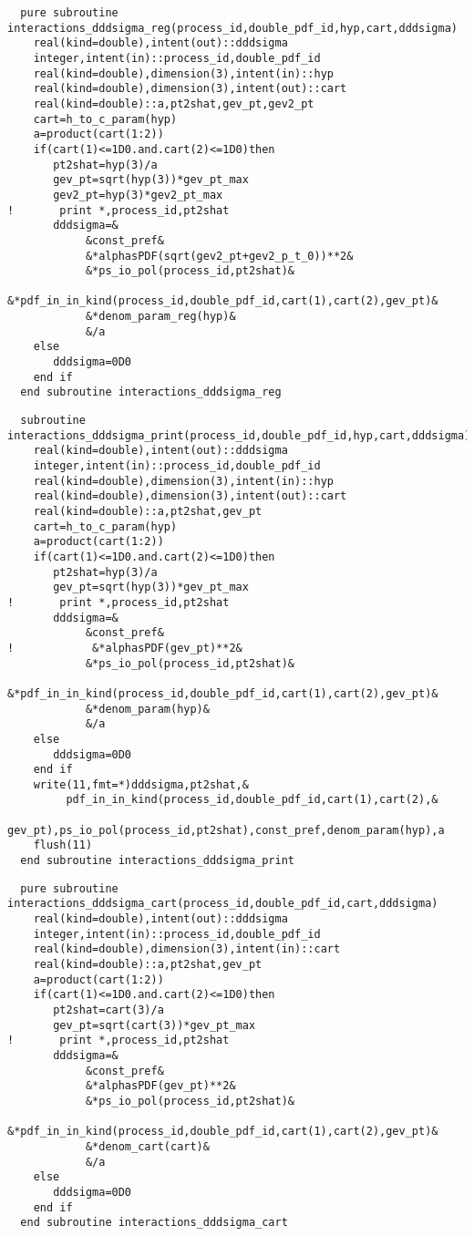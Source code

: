 \begin{Verbatim}
  pure subroutine interactions_dddsigma_reg(process_id,double_pdf_id,hyp,cart,dddsigma)
    real(kind=double),intent(out)::dddsigma
    integer,intent(in)::process_id,double_pdf_id
    real(kind=double),dimension(3),intent(in)::hyp
    real(kind=double),dimension(3),intent(out)::cart
    real(kind=double)::a,pt2shat,gev_pt,gev2_pt
    cart=h_to_c_param(hyp)
    a=product(cart(1:2))
    if(cart(1)<=1D0.and.cart(2)<=1D0)then
       pt2shat=hyp(3)/a
       gev_pt=sqrt(hyp(3))*gev_pt_max
       gev2_pt=hyp(3)*gev2_pt_max
!       print *,process_id,pt2shat
       dddsigma=&
            &const_pref&
            &*alphasPDF(sqrt(gev2_pt+gev2_p_t_0))**2&
            &*ps_io_pol(process_id,pt2shat)&
            &*pdf_in_in_kind(process_id,double_pdf_id,cart(1),cart(2),gev_pt)&
            &*denom_param_reg(hyp)&
            &/a
    else
       dddsigma=0D0
    end if
  end subroutine interactions_dddsigma_reg
\end{Verbatim}

\begin{Verbatim}
  subroutine interactions_dddsigma_print(process_id,double_pdf_id,hyp,cart,dddsigma)
    real(kind=double),intent(out)::dddsigma
    integer,intent(in)::process_id,double_pdf_id
    real(kind=double),dimension(3),intent(in)::hyp
    real(kind=double),dimension(3),intent(out)::cart
    real(kind=double)::a,pt2shat,gev_pt
    cart=h_to_c_param(hyp)
    a=product(cart(1:2))
    if(cart(1)<=1D0.and.cart(2)<=1D0)then
       pt2shat=hyp(3)/a
       gev_pt=sqrt(hyp(3))*gev_pt_max
!       print *,process_id,pt2shat
       dddsigma=&
            &const_pref&
!            &*alphasPDF(gev_pt)**2&
            &*ps_io_pol(process_id,pt2shat)&
            &*pdf_in_in_kind(process_id,double_pdf_id,cart(1),cart(2),gev_pt)&
            &*denom_param(hyp)&
            &/a
    else
       dddsigma=0D0
    end if
    write(11,fmt=*)dddsigma,pt2shat,&
         pdf_in_in_kind(process_id,double_pdf_id,cart(1),cart(2),&
         gev_pt),ps_io_pol(process_id,pt2shat),const_pref,denom_param(hyp),a
    flush(11)
  end subroutine interactions_dddsigma_print
\end{Verbatim}

\begin{Verbatim}
  pure subroutine interactions_dddsigma_cart(process_id,double_pdf_id,cart,dddsigma)
    real(kind=double),intent(out)::dddsigma
    integer,intent(in)::process_id,double_pdf_id
    real(kind=double),dimension(3),intent(in)::cart
    real(kind=double)::a,pt2shat,gev_pt
    a=product(cart(1:2))
    if(cart(1)<=1D0.and.cart(2)<=1D0)then
       pt2shat=cart(3)/a
       gev_pt=sqrt(cart(3))*gev_pt_max
!       print *,process_id,pt2shat
       dddsigma=&
            &const_pref&
            &*alphasPDF(gev_pt)**2&
            &*ps_io_pol(process_id,pt2shat)&
            &*pdf_in_in_kind(process_id,double_pdf_id,cart(1),cart(2),gev_pt)&
            &*denom_cart(cart)&
            &/a
    else
       dddsigma=0D0
    end if
  end subroutine interactions_dddsigma_cart
\end{Verbatim}

